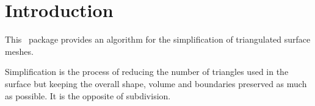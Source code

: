 
\section{Introduction}

This \cgal\ package provides an algorithm for the simplification of triangulated surface meshes.

Simplification is the process of reducing the number of triangles used in the surface but 
keeping the overall shape, volume and boundaries preserved as much as possible. 
It is the opposite of subdivision.

